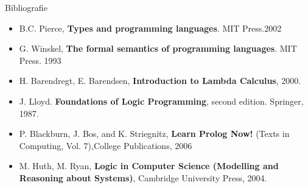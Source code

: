 \documentclass[xcolor=x11names,compress,10pt]{beamer}
\begin{document}
\begin{frame}{Bibliografie}
\begin{itemize}
\item B.C. Pierce,  {\bf Types and programming languages}. MIT Press.2002
\item G. Winskel,  {\bf The formal semantics of programming languages}. MIT Press. 1993
\item H. Barendregt, E. Barendsen, {\bf Introduction to Lambda Calculus}, 2000.
\item J. Lloyd. {\bf Foundations of Logic Programming}, second edition. Springer, 1987.
\item P. Blackburn, J. Bos, and K. Striegnitz, {\bf Learn Prolog Now!} (Texts in Computing, Vol. 7),College Publications, 2006
\item M. Huth, M. Ryan, {\bf Logic in Computer Science (Modelling and Reasoning about Systems)}, Cambridge University Press, 2004.
\end{itemize}
\end{frame}


%
%
%
\end{document}
